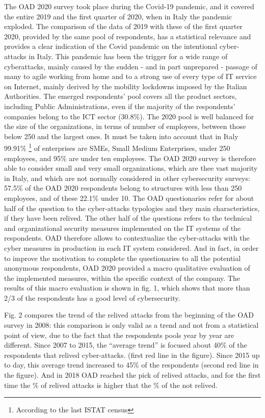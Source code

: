 \documentclass{easychair}
\begin{document}
The OAD 2020 survey took place during the Covid-19 pandemic, and it covered the entire 2019 and the first quarter of 2020, when in Italy the pandemic exploded.
The comparison of the data of 2019 with these of the first quarter 2020, provided by the same pool of respondents, has a statistical relevance and provides a 
clear indication of the Covid pandemic on the intentional cyber-attacks in Italy. This pandemic has been the trigger for a wide range of cyberattacks, mainly 
caused by the sudden - and in part unprepared - passage of many to agile working from home and to a strong use of every type of IT service on Internet, mainly
derived by the mobility lockdowns imposed by the Italian Authorities. The emerged respondents’ pool covers all the product sectors, including Public Administrations,
even if the majority of the respondents’ companies belong to the ICT sector (30.8\%). The 2020 pool  is well balanced for the size of the organizations, in terms
of number of employees, between those below 250 and the largest ones. It must be taken into account that in Italy 99.91\% \footnote{According to the last ISTAT census}
of enterprises are SMEs, Small Medium Enterprises, under 250 employees, and 95\% are under ten employees. The OAD 2020 survey is therefore able to consider small and 
very small organizations, which are thee vast majority in Italy, and which are not normally considered in other cybersecurity surveys: 57.5\% of the OAD 2020 respondents
belong to structures with less than 250 employees, and of these 22.1\% under 10. The OAD questionaries refer for about half of the question to the cyber-attacks 
typologies and they main characteristics, if they have been relived. The other half of the questions refers to the technical and organizational security measures implemented
on the IT systems of the respondents. OAD therefore allows to contextualize the cyber-attacks with the cyber measures in production in each IT system considered. 
And in fact, in order to improve the motivation to complete the questionaries to all the potential anonymous respondents, OAD 2020 provided a macro qualitative evaluation
of the implemented measures, within the specific context of the company. The results of  this macro evaluation is shown in fig. 1, which shows that more than 2/3 of the respondents has a good level of cybersecurity.


Fig. 2 compares the trend of the relived attacks from the beginning of the OAD survey in 2008: this comparison is only valid as a trend and not from a statistical point 
of view, due to the fact that the respondents pools year by year are different. Since 2007 to 2015, the “average trend” is focused about 40\% of the respondents that relived
cyber-attacks. (first red line in the figure). Since 2015 up to day, this average trend increased to 45\% of the respondents (second red line in the figure). And in 2018 OAD 
reached the pick of relived attacks, and  for the first time  the \% of relived attacks is higher that the \% of the not relived.
\end{document}
